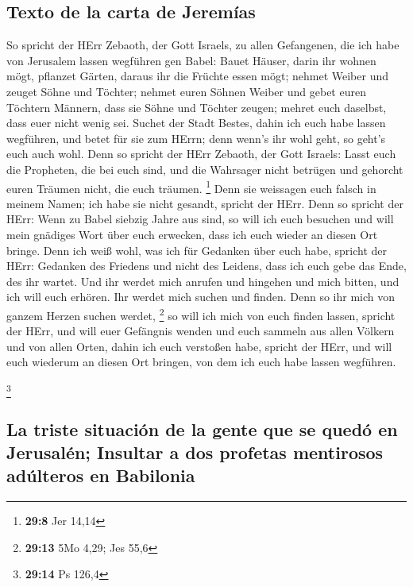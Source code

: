 \hypertarget{texto-de-la-carta-de-jeremuxedas}{%
\subsection{Texto de la carta de
Jeremías}\label{texto-de-la-carta-de-jeremuxedas}}

 So spricht der HErr Zebaoth, der Gott Israels, zu allen
Gefangenen, die ich habe von Jerusalem lassen wegführen gen Babel:
 Bauet Häuser, darin ihr wohnen mögt, pflanzet Gärten,
daraus ihr die Früchte essen mögt;  nehmet Weiber und
zeuget Söhne und Töchter; nehmet euren Söhnen Weiber und gebet euren
Töchtern Männern, dass sie Söhne und Töchter zeugen; mehret euch
daselbst, dass euer nicht wenig sei.  Suchet der Stadt
Bestes, dahin ich euch habe lassen wegführen, und betet für sie zum
HErrn; denn wenn's ihr wohl geht, so geht's euch auch wohl.
 Denn so spricht der HErr Zebaoth, der Gott Israels: Lasst
euch die Propheten, die bei euch sind, und die Wahrsager nicht betrügen
und gehorcht euren Träumen nicht, die euch träumen. \footnote{\textbf{29:8}
  Jer 14,14}  Denn sie weissagen euch falsch in meinem
Namen; ich habe sie nicht gesandt, spricht der HErr. 
Denn so spricht der HErr: Wenn zu Babel siebzig Jahre aus sind, so will
ich euch besuchen und will mein gnädiges Wort über euch erwecken, dass
ich euch wieder an diesen Ort bringe.  Denn ich weiß
wohl, was ich für Gedanken über euch habe, spricht der HErr: Gedanken
des Friedens und nicht des Leidens, dass ich euch gebe das Ende, des ihr
wartet.  Und ihr werdet mich anrufen und hingehen und
mich bitten, und ich will euch erhören.  Ihr werdet mich
suchen und finden. Denn so ihr mich von ganzem Herzen suchen werdet,
\footnote{\textbf{29:13} 5Mo 4,29; Jes 55,6}  so will ich
mich von euch finden lassen, spricht der HErr, und will euer Gefängnis
wenden und euch sammeln aus allen Völkern und von allen Orten, dahin ich
euch verstoßen habe, spricht der HErr, und will euch wiederum an diesen
Ort bringen, von dem ich euch habe lassen wegführen.

\footnote{\textbf{29:14} Ps 126,4}

\hypertarget{la-triste-situaciuxf3n-de-la-gente-que-se-queduxf3-en-jerusaluxe9n-insultar-a-dos-profetas-mentirosos-aduxfalteros-en-babilonia}{%
\subsection{La triste situación de la gente que se quedó en Jerusalén;
Insultar a dos profetas mentirosos adúlteros en
Babilonia}\label{la-triste-situaciuxf3n-de-la-gente-que-se-queduxf3-en-jerusaluxe9n-insultar-a-dos-profetas-mentirosos-aduxfalteros-en-babilonia}}

